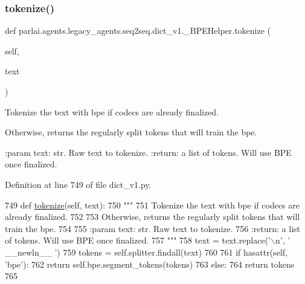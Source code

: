 \mbox{\label{classparlai_1_1agents_1_1legacy__agents_1_1seq2seq_1_1dict__v1_1_1__BPEHelper_a4123dd721a13dc6607498ae29d7dd8a3}} 
\subsubsection{\texorpdfstring{tokenize()}{tokenize()}}
{\footnotesize\ttfamily def parlai.\+agents.\+legacy\+\_\+agents.\+seq2seq.\+dict\+\_\+v1.\+\_\+\+B\+P\+E\+Helper.\+tokenize (\begin{DoxyParamCaption}\item[{}]{self,  }\item[{}]{text }\end{DoxyParamCaption})}

\begin{DoxyVerb}Tokenize the text with bpe if codecs are already finalized.

Otherwise, returns the regularly split tokens that will train the bpe.

:param text: str. Raw text to tokenize.
:return: a list of tokens. Will use BPE once finalized.
\end{DoxyVerb}
 

Definition at line 749 of file dict\+\_\+v1.\+py.


\begin{DoxyCode}
749     \textcolor{keyword}{def }\hyperlink{namespaceparlai_1_1agents_1_1tfidf__retriever_1_1build__tfidf_a1fdb457e98eb4e4c26047e229686a616}{tokenize}(self, text):
750         \textcolor{stringliteral}{"""}
751 \textcolor{stringliteral}{        Tokenize the text with bpe if codecs are already finalized.}
752 \textcolor{stringliteral}{}
753 \textcolor{stringliteral}{        Otherwise, returns the regularly split tokens that will train the bpe.}
754 \textcolor{stringliteral}{}
755 \textcolor{stringliteral}{        :param text: str. Raw text to tokenize.}
756 \textcolor{stringliteral}{        :return: a list of tokens. Will use BPE once finalized.}
757 \textcolor{stringliteral}{        """}
758         text = text.replace(\textcolor{stringliteral}{'\(\backslash\)n'}, \textcolor{stringliteral}{' \_\_newln\_\_ '})
759         tokens = self.splitter.findall(text)
760 
761         \textcolor{keywordflow}{if} hasattr(self, \textcolor{stringliteral}{'bpe'}):
762             \textcolor{keywordflow}{return} self.bpe.segment\_tokens(tokens)
763         \textcolor{keywordflow}{else}:
764             \textcolor{keywordflow}{return} tokens
765 
\end{DoxyCode}


